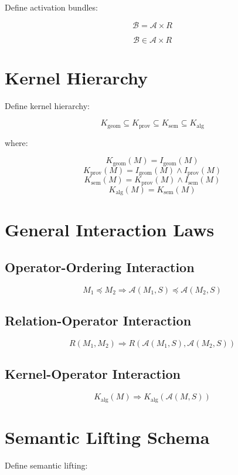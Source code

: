 \documentclass[11pt]{article}
\begin{document}
Define activation bundles:

\[
\mathcal{B} = \mathcal{A} \times R
\]

\[
\mathcal{B} \in \mathcal{A} \times R
\]

\section*{Kernel Hierarchy}

Define kernel hierarchy:

\[
K_{\text{geom}} \subseteq K_{\text{prov}} \subseteq K_{\text{sem}} \subseteq K_{\text{alg}}
\]

where:

\[
K_{\text{geom}}(M) = I_{\text{geom}}(M)
\]
\[
K_{\text{prov}}(M) = I_{\text{geom}}(M) \land I_{\text{prov}}(M)
\]
\[
K_{\text{sem}}(M) = K_{\text{prov}}(M) \land I_{\text{sem}}(M)
\]
\[
K_{\text{alg}}(M) = K_{\text{sem}}(M)
\]

\section*{General Interaction Laws}

\subsection*{Operator-Ordering Interaction}

\[
M_1 \preceq M_2 \Rightarrow
\mathcal{A}(M_1, S) \preceq \mathcal{A}(M_2, S)
\]

\subsection*{Relation-Operator Interaction}

\[
R(M_1, M_2) \Rightarrow
R(\mathcal{A}(M_1, S), \mathcal{A}(M_2, S))
\]

\subsection*{Kernel-Operator Interaction}

\[
K_{\text{alg}}(M) \Rightarrow K_{\text{alg}}(\mathcal{A}(M, S))
\]

\section*{Semantic Lifting Schema}

Define semantic lifting:
\end{document}
